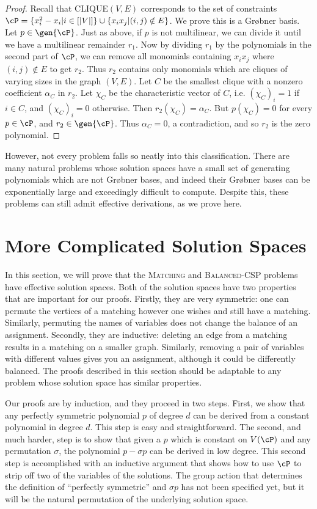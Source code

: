 \begin{proof}
Recall that \textsc{CLIQUE}$(V,E)$ corresponds to the set of constraints $\cP = \{x_i^2 - x_i | i \in [|V|]\} \cup \{ x_ix_j | (i,j) \notin E\}$. 
We prove this is a Gr\o bner basis. Let $p \in \gen{\cP}$. Just as above, if $p$ is not multilinear, we can divide it until we have a multilinear
remainder $r_1$. Now by dividing $r_1$ by the polynomials in the second part of $\cP$, we can remove all monomials containing $x_ix_j$ where $(i,j) \notin E$
to get $r_2$. Thus $r_2$ contains only monomials which are cliques of varying sizes in the graph $(V,E)$. Let $C$ be the smallest clique with a
nonzero coefficient $\alpha_C$ in $r_2$. Let $\chi_C$ be the characteristic vector of $C$, i.e. $(\chi_C)_i = 1$ if $i \in C$, and $(\chi_C)_i = 0$ otherwise.
Then $r_2(\chi_C) = \alpha_C$. But $p(\chi_C) = 0$ for every $p \in \cP$, and $r_2 \in \gen{\cP}$. Thus $\alpha_C = 0$, a contradiction, and so $r_2$ is the 
zero polynomial.
\end{proof}

However, not every problem falls so neatly into this classification. There are many natural problems whose solution spaces have a small set of generating
polynomials which are not Gr\o bner bases, and indeed their Gr\o bner bases can be exponentially large and exceedingly difficult to compute. Despite this,
these problems can still admit effective derivations, as we prove here.

\section{More Complicated Solution Spaces}
In this section, we will prove that the \textsc{Matching} and \textsc{Balanced-CSP} problems have effective solution spaces. Both of the solution spaces have
two properties that are important for our proofs. Firstly, they are very symmetric: one can permute the vertices of a matching however one wishes and still have a matching. Similarly, permuting the names of variables does not change the balance of an assignment. 
Secondly, they are inductive: deleting an edge from a matching results in a matching on a smaller graph. 
Similarly, removing a pair of variables with different values gives you an assignment, although it could be differently balanced.
The proofs described in this section should be adaptable to any problem whose solution space has similar properties.

Our proofs are by induction, and they proceed in two steps. 
First, we show that any perfectly symmetric polynomial $p$ of degree $d$ can be derived from a constant polynomial in degree $d$.
This step is easy and straightforward. 
The second, and much harder, step is to show that given a $p$ which is constant on $V(\cP)$ and any permutation $\sigma$, the polynomial $p - \sigma p$ can be derived in low degree. 
This second step is accomplished with an inductive argument that shows how to use $\cP$ to strip off two of the variables of the solutions. 
The group action that determines the definition of "`perfectly symmetric"' and $\sigma p$ has not been specified yet, but it will be the natural permutation of the underlying solution space.

